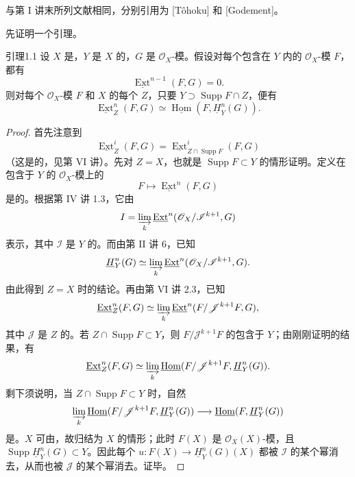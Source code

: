 与第 I 讲末所列文献相同，分别引用为 [Tôhoku] 和 [Godement]。

先证明一个引理。
\begin{SGAresult}{引理}{1.1}
设 $X$ 是，$Y$ 是 $X$ 的，$G$ 是 $\mathscr O_X$-模。假设对每个包含在 $Y$ 内的 $\mathscr O_X$-模 $F$，都有
\[\underline{\operatorname{Ext}}^{n-1}(F,G)=0.\]
则对每个 $\mathscr O_X$-模 $F$ 和 $X$ 的每个 $Z$，只要 $Y\supset\operatorname{Supp}F\cap Z$，便有
\[\underline{\operatorname{Ext}}^n_Z(F,G)\simeq\underline{\operatorname{Hom}}(F,\underline H^n_Y(G)).\]
\end{SGAresult}
\begin{proof}
首先注意到
\[\underline{\operatorname{Ext}}^i_Z(F,G)=\underline{\operatorname{Ext}}^i_{Z\cap\operatorname{Supp}F}(F,G)\]
（这是的，见第 VI 讲）。先对 $Z=X$，也就是 $\operatorname{Supp}F\subset Y$ 的情形证明。定义在包含于 $Y$ 的 $\mathscr O_X$-模上的
\[F\longmapsto\underline{\operatorname{Ext}}^n(F,G)\]
是的。根据第 IV 讲 1.3，它由
\[I=\varinjlim_k\underline{\operatorname{Ext}}^n(\mathscr O_X/\mathscr I^{k+1},G)\]
表示，其中 $\mathscr I$ 是 $Y$ 的。而由第 II 讲 6，已知
\[\underline H^n_Y(G)\simeq\varinjlim_k\underline{\operatorname{Ext}}^n(\mathscr O_X/\mathscr I^{k+1},G).\]
由此得到 $Z=X$ 时的结论。再由第 VI 讲 2.3，已知
\[\underline{\operatorname{Ext}}^n_Z(F,G)\simeq\varinjlim_k\underline{\operatorname{Ext}}^n(F/\mathscr J^{k+1}F,G),\]
其中 $\mathscr J$ 是 $Z$ 的。若 $Z\cap\operatorname{Supp}F\subset Y$，则 $F/\mathscr J^{k+1}F$ 的包含于 $Y$；由刚刚证明的结果，有
\[\underline{\operatorname{Ext}}^n_Z(F,G)\simeq\varinjlim_k\underline{\operatorname{Hom}}(F/\mathscr J^{k+1}F,\underline H^n_Y(G)).\]
剩下须说明，当 $Z\cap\operatorname{Supp}F\subset Y$ 时，自然
\[\varinjlim_k\underline{\operatorname{Hom}}(F/\mathscr J^{k+1}F,\underline H^n_Y(G))\longrightarrow\underline{\operatorname{Hom}}(F,\underline H^n_Y(G))\]
是。$X$ 可由，故归结为 $X$ 的情形；此时 $F(X)$ 是 $\mathscr O_X(X)$-模，且 $\operatorname{Supp}\underline H^n_Y(G)\subset Y$。因此每个 $u:F(X)\to\underline H^n_Y(G)(X)$ 都被 $\mathscr I$ 的某个幂消去，从而也被 $\mathscr J$ 的某个幂消去。证毕。
\end{proof}
